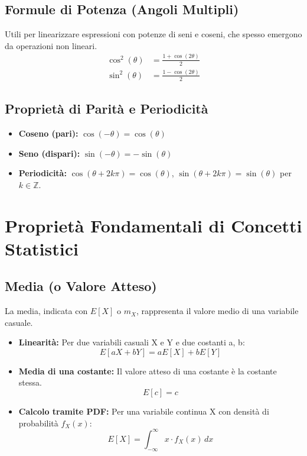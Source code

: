 \subsection{Formule di Potenza (Angoli Multipli)}
Utili per linearizzare espressioni con potenze di seni e coseni, che spesso emergono da operazioni non lineari.
\begin{align*}
    \cos^2(\theta) &= \frac{1 + \cos(2\theta)}{2} \\
    \sin^2(\theta) &= \frac{1 - \cos(2\theta)}{2}
\end{align*}

\subsection{Proprietà di Parità e Periodicità}
\begin{itemize}
    \item \textbf{Coseno (pari):} $\cos(-\theta) = \cos(\theta)$
    \item \textbf{Seno (dispari):} $\sin(-\theta) = -\sin(\theta)$
    \item \textbf{Periodicità:} $\cos(\theta + 2k\pi) = \cos(\theta)$, $\sin(\theta + 2k\pi) = \sin(\theta)$ per $k \in \mathbb{Z}$.
\end{itemize}

\section{Proprietà Fondamentali di Concetti Statistici}

\subsection{Media (o Valore Atteso)}
La media, indicata con $E[X]$ o $m_X$, rappresenta il valore medio di una variabile casuale.

\begin{itemize}
    \item \textbf{Linearità:} Per due variabili casuali X e Y e due costanti a, b:
    $$ E[aX + bY] = aE[X] + bE[Y] $$
    
    \item \textbf{Media di una costante:} Il valore atteso di una costante è la costante stessa.
    $$ E[c] = c $$
    
    \item \textbf{Calcolo tramite PDF:} Per una variabile continua X con densità di probabilità $f_X(x)$:
    $$ E[X] = \int_{-\infty}^{\infty} x \cdot f_X(x) \,dx $$
\end{itemize}


